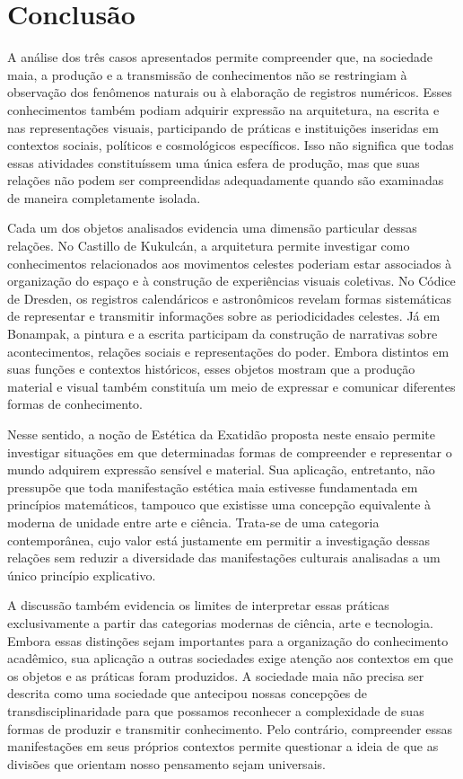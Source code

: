 \documentclass[11pt, a4paper]{article}
\begin{document}
\section{ Conclusão}

A análise dos três casos apresentados permite compreender que, na sociedade maia, a produção e a transmissão de conhecimentos não se restringiam à observação dos fenômenos naturais ou à elaboração de registros numéricos. Esses conhecimentos também podiam adquirir expressão na arquitetura, na escrita e nas representações visuais, participando de práticas e instituições inseridas em contextos sociais, políticos e cosmológicos específicos. Isso não significa que todas essas atividades constituíssem uma única esfera de produção, mas que suas relações não podem ser compreendidas adequadamente quando são examinadas de maneira completamente isolada.

Cada um dos objetos analisados evidencia uma dimensão particular dessas relações. No Castillo de Kukulcán, a arquitetura permite investigar como conhecimentos relacionados aos movimentos celestes poderiam estar associados à organização do espaço e à construção de experiências visuais coletivas. No Códice de Dresden, os registros calendáricos e astronômicos revelam formas sistemáticas de representar e transmitir informações sobre as periodicidades celestes. Já em Bonampak, a pintura e a escrita participam da construção de narrativas sobre acontecimentos, relações sociais e representações do poder. Embora distintos em suas funções e contextos históricos, esses objetos mostram que a produção material e visual também constituía um meio de expressar e comunicar diferentes formas de conhecimento.

Nesse sentido, a noção de Estética da Exatidão proposta neste ensaio permite investigar situações em que determinadas formas de compreender e representar o mundo adquirem expressão sensível e material. Sua aplicação, entretanto, não pressupõe que toda manifestação estética maia estivesse fundamentada em princípios matemáticos, tampouco que existisse uma concepção equivalente à moderna de unidade entre arte e ciência. Trata-se de uma categoria contemporânea, cujo valor está justamente em permitir a investigação dessas relações sem reduzir a diversidade das manifestações culturais analisadas a um único princípio explicativo.

A discussão também evidencia os limites de interpretar essas práticas exclusivamente a partir das categorias modernas de ciência, arte e tecnologia. Embora essas distinções sejam importantes para a organização do conhecimento acadêmico, sua aplicação a outras sociedades exige atenção aos contextos em que os objetos e as práticas foram produzidos. A sociedade maia não precisa ser descrita como uma sociedade que antecipou nossas concepções de transdisciplinaridade para que possamos reconhecer a complexidade de suas formas de produzir e transmitir conhecimento. Pelo contrário, compreender essas manifestações em seus próprios contextos permite questionar a ideia de que as divisões que orientam nosso pensamento sejam universais.
\end{document}
